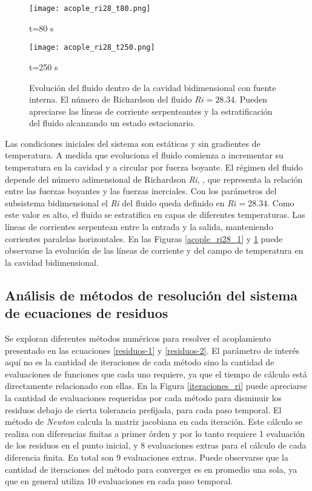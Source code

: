 \begin{figure}[ht]
	\begin{minipage}{0.5\linewidth}
		\centering
		\texttt{[image: acople\_ri28\_t80.png]}
		\caption[]{t=80 s}
		\label{asd}	
	\end{minipage}
	\begin{minipage}{0.5\linewidth}
		\centering
		\texttt{[image: acople\_ri28\_t250.png]}
		\caption[]{t=250 s}
		\label{asd}	
	\end{minipage}
	\caption[Evolución hacia el estado estacionario del fluido dentro de la cavidad bidimensional con fuente interna]
  {Evolución del fluido dentro de la cavidad bidimensional con fuente interna.
	El número de Richardson del fluido $Ri=28.34$.
	Pueden apreciarse las líneas de corriente serpenteantes y la estratificación del fluido alcanzando un estado estacionario.}  
	\label{acople_ri28_2}
\end{figure}

Las condiciones iniciales del sistema son estáticas y sin gradientes de temperatura.
A medida que evoluciona el fluido comienza a incrementar su temperatura en la cavidad y a circular por fuerza boyante.
El régimen del fluido depende del número adimensional de Richardson \textit{Ri}, \cite{richardson},
que representa la relación entre las fuerzas boyantes y las fuerzas inerciales.
Con los parámetros del subsistema bidimensional el \textit{Ri} del fluido queda definido en $Ri=28.34$.
Como este valor es alto, el fluido se estratifica en capas de diferentes temperaturas.
Las líneas de corrientes serpentean entre la entrada y la salida, manteniendo corrientes paralelas horizontales.
En las Figuras \ref{acople_ri28_1} y \ref{acople_ri28_2} puede observarse 
la evolución de las líneas de corriente y del campo de temperatura en la cavidad bidimensional.

\subsection*{Análisis de métodos de resolución del sistema de ecuaciones de residuos}

Se exploran diferentes métodos numéricos para resolver el acoplamiento presentado en las ecuaciones \ref{residuos-1} y \ref{residuos-2}.
El parámetro de interés aquí no es la cantidad de iteraciones de cada método sino la cantidad de evaluaciones de funciones que cada uno requiere,
ya que el tiempo de cálculo está directamente relacionado con ellas.
En la Figura \ref{iteraciones_ri} puede apreciarse la cantidad de evaluaciones requeridas 
por cada método para disminuir los residuos debajo de cierta tolerancia prefijada, para cada paso temporal.
El método de \textit{Newton} calcula la matriz jacobiana en cada iteración.
Este cálculo se realiza con diferencias finitas a primer órden y por lo tanto requiere 1 evaluación de los residuos en el punto inicial, y 8 evaluaciones extras para el cálculo de cada diferencia finita.
En total son 9 evaluaciones extras.
Puede observarse que la cantidad de iteraciones del método para converger es en promedio una sola, ya que en general utiliza 10 evaluaciones en cada paso temporal.

